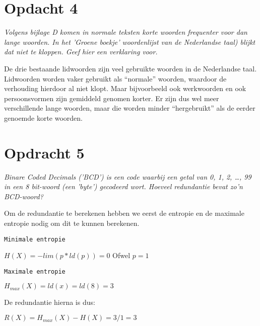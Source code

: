 \section{Opdacht 4}
\emph{Volgens bijlage D komen in normale teksten korte woorden frequenter voor dan lange woorden. In het 'Groene boekje' woordenlijst van de Nederlandse taal) blijkt dat niet te kloppen.  Geef hier een verklaring voor.}

De drie bestaande lidwoorden zijn veel gebruikte woorden in de Nederlandse taal. Lidwoorden worden vaker gebruikt als ``normale'' woorden, waardoor de verhouding hierdoor al niet klopt. Maar bijvoorbeeld ook werkwoorden en ook persoonsvormen zijn gemiddeld genomen korter. Er zijn dus wel meer verschillende lange woorden, maar die worden minder ``hergebruikt'' als de eerder genoemde korte woorden. 

\section{Opdracht 5}
\emph{Binare Coded Decimals ('BCD') is een code waarbij een getal van 0, 1, 2, \ldots, 99 in een 8 bit-woord (een '\emph{byte}') gecodeerd wort. Hoeveel redundantie bevat zo'n BCD-woord?}

Om de redundantie te berekenen hebben we eerst de entropie en de maximale entropie nodig om dit te kunnen berekenen.

\texttt{Minimale entropie}

$H(X)=-lim(p*ld(p))=0$
Ofwel
$p=1$

\texttt{Maximale entropie}

$H_{max}(X)=ld(x)=ld(8)=3$

De redundantie hierna is dus:

$R(X)=H_{max}(X)-H(X)=3/1=3$

